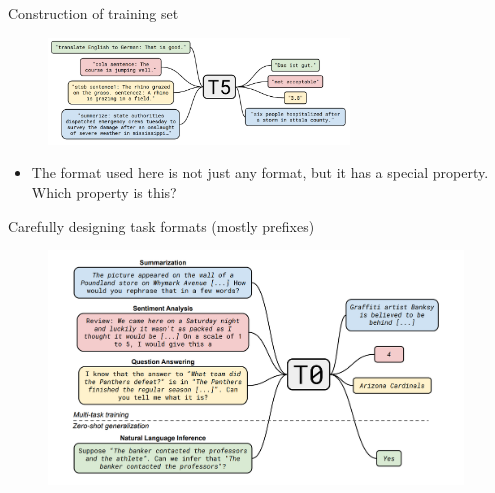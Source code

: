 \begin{frame}{Construction of training set}

\vfill
	
	\begin{figure}
		\centering
		\includegraphics[width = 8cm]{figure/62-t5.png}\\ 
	\end{figure}

\pause

\begin{itemize}
    \item \ques The format used here is not just any
    format, but it has a special property. Which property is this?



\end{itemize}

\vfill

\end{frame}





\begin{frame}{Carefully designing task formats (mostly prefixes)}

\vfill
	
	\begin{figure}
		\centering
		\includegraphics[width = 11cm]{figure/81-t0.png}\\ 
	\end{figure}

\vfill

\end{frame}

